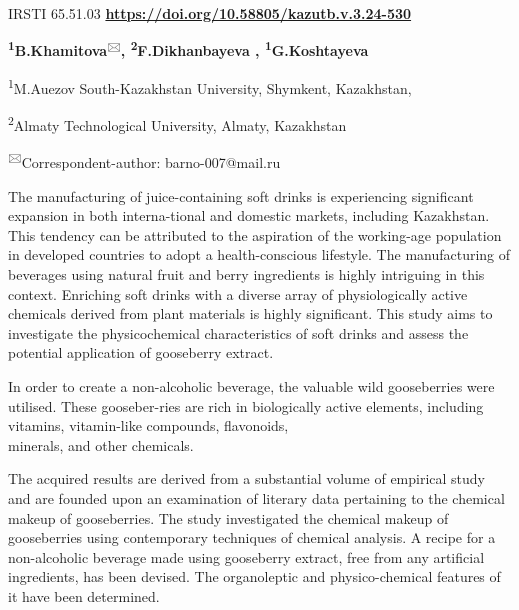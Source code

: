 \newpage
IRSTI 65.51.03
\hfill {\bfseries \href{https://doi.org/10.58805/kazutb.v.3.24-530}{https://doi.org/10.58805/kazutb.v.3.24-530}}

\begin{center}

{\bfseries \textsuperscript{1}B.Khamitova}\textsuperscript{🖂}{\bfseries ,
\textsuperscript{2}F.Dikhanbayeva , \textsuperscript{1}G.Koshtayeva}

\textsuperscript{1}M.Auezov South-Kazakhstan University, Shymkent,
Kazakhstan,

\textsuperscript{2}Almaty Technological University, Almaty, Kazakhstan
\end{center}

\textsuperscript{🖂}Correspondent-author: barno-007@mail.ru\vspace{0.5cm}

The manufacturing of juice-containing soft drinks is experiencing
significant expansion in both interna-tional and domestic markets,
including Kazakhstan. This tendency can be attributed to the aspiration
of the working-age population in developed countries to adopt a
health-conscious lifestyle. The manufacturing of beverages using natural
fruit and berry ingredients is highly intriguing in this context.
Enriching soft drinks with a diverse array of physiologically active
chemicals derived from plant materials is highly significant. This study
aims to investigate the physicochemical characteristics of soft drinks
and assess the potential application of gooseberry extract.~

In order to create a non-alcoholic beverage, the valuable wild
gooseberries were utilised. These gooseber-ries are rich in biologically
active elements, including vitamins, vitamin-like compounds, flavonoids,
\\minerals, and other chemicals.~

The acquired results are derived from a substantial volume of empirical
study and are founded upon an examination of literary data pertaining to
the chemical makeup of gooseberries. The study investigated the chemical
makeup of gooseberries using contemporary techniques of chemical
analysis. A recipe for a non-alcoholic beverage made using gooseberry
extract, free from any artificial ingredients, has been devised. The
organoleptic and physico-chemical features of it have been determined.~

